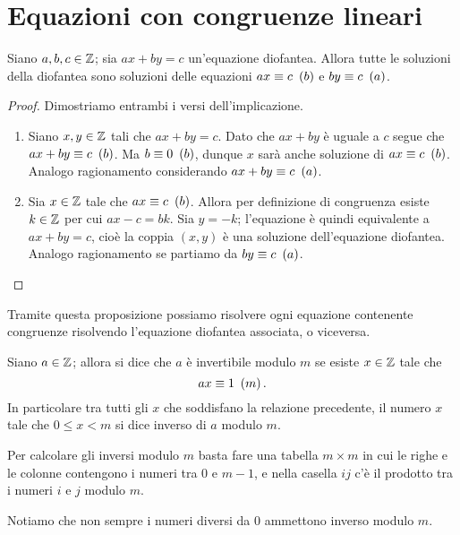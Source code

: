 \section{Equazioni con congruenze lineari}

\begin{proposition}
    Siano $a, b, c \in \mathbb{Z}$; sia $ax + by = c$ un'equazione diofantea. Allora tutte le soluzioni della diofantea sono soluzioni delle equazioni $ax \equiv c \ \left(b\right)$ e $by \equiv c \ \left(a\right)$.
\end{proposition}
\begin{proof}
    Dimostriamo entrambi i versi dell'implicazione.
    \begin{enumerate}
        \item Siano $x, y \in \mathbb{Z}$ tali che $ax + by = c$. Dato che $ax + by$ è uguale a $c$ segue che $ax + by \equiv c \ \left(b\right)$. Ma $b \equiv 0 \ \left(b\right)$, dunque $x$ sarà anche soluzione di $ax \equiv c \ \left(b\right)$. Analogo ragionamento considerando $ax + by \equiv c \ \left(a\right)$.
        \item Sia $x \in \mathbb{Z}$ tale che $ax \equiv c \ \left(b\right)$. Allora per definizione di congruenza esiste $k \in \mathbb{Z}$ per cui $ax - c = bk$. Sia $y = -k$; l'equazione è quindi equivalente a $ax + by = c$, cioè la coppia $(x, y)$ è una soluzione dell'equazione diofantea. Analogo ragionamento se partiamo da $by \equiv c \ \left(a\right)$. \qedhere
    \end{enumerate}
\end{proof}

Tramite questa proposizione possiamo risolvere ogni equazione contenente congruenze risolvendo l'equazione diofantea associata, o viceversa.

\begin{definition}
    Siano $a \in \mathbb{Z}$; allora si dice che $a$ è invertibile modulo $m$ se esiste  $x \in \mathbb{Z}$ tale che \[
        ax \equiv 1 \ \left(m\right)
    .\]
    In particolare tra tutti gli $x$ che soddisfano la relazione precedente, il numero $x$ tale che $0 \leq x < m$ si dice inverso di $a$ modulo $m$.
\end{definition}
Per calcolare gli inversi modulo $m$ basta fare una tabella $m \times m$ in cui le righe e le colonne contengono i numeri tra $0$ e $m-1$, e nella casella $ij$ c'è il prodotto tra i numeri $i$ e $j$ modulo $m$.

Notiamo che non sempre i numeri diversi da $0$ ammettono inverso modulo $m$.

